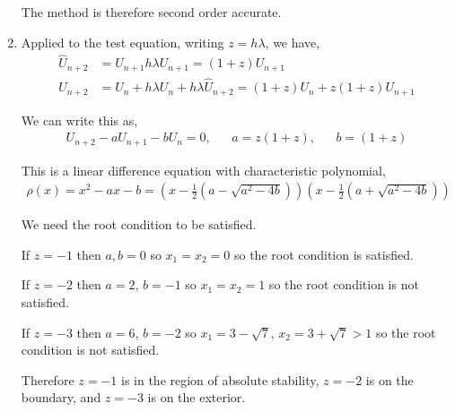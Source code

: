 \documentclass[10pt]{article}
\begin{document}
\begin{solution}[Solution]
\begin{enumerate}[label=(\alph*)]
        The method is therefore second order accurate.



        


    \item Applied to the test equation, writing \( z = h \lambda \), we have,
        \begin{align*}
            \hat{U}_{n+2} &= U_{n+1} h \lambda U_{n+1} = (1+z) U_{n+1}
            \\U_{n+2} &= U_n + h \lambda U_n + h \lambda \hat{U}_{n+2}
            = (1+z) U_n + z(1+z) U_{n+1}
        \end{align*}
        
        We can write this as,
        \begin{align*}
            U_{n+2} - a U_{n+1} - bU_n = 0, && a = z(1+z), && b = (1+z)
        \end{align*}
        
        This is a linear difference equation with characteristic polynomial,
        \begin{align*}
            \rho(x) = x^2 - ax - b = \left( x-\frac{1}{2} \left( a - \sqrt{a^2-4b} \right) \right)\left( x-\frac{1}{2} \left( a + \sqrt{a^2-4b} \right) \right)
        \end{align*}

        We need the root condition to be satisfied.

        If \( z = -1 \) then \( a,b = 0 \) so \( x_1 = x_2 = 0  \) so the root condition is satisfied.

        If \( z = -2 \) then \( a = 2 \), \( b = -1 \) so \( x_1=x_2=1 \) so the root condition is not satisfied.

        If \( z = -3 \) then \( a = 6 \), \( b = -2 \) so \( x_1=3-\sqrt{7} \), \( x_2 = 3+\sqrt{7} > 1 \) so the root condition is not satisfied.

        Therefore \( z=-1 \) is in the region of absolute stability, \( z=-2 \) is on the boundary, and \( z=-3 \) is on the exterior.



\end{enumerate}
\end{solution}
\end{document}
